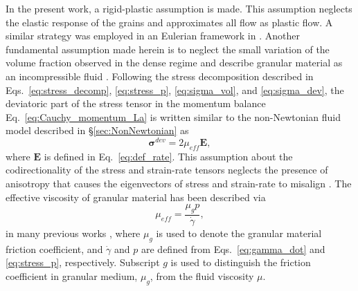 In the present work, a rigid-plastic assumption is made. This assumption neglects the elastic response of the grains and approximates all flow as plastic flow. A similar strategy was employed in an Eulerian framework in \cite{lagree2011granular}. Another fundamental assumption made herein is to neglect the small variation of the volume fraction observed in the dense regime and describe granular material as an incompressible fluid \cite{jop2006constitutiveNature,kamrin2017hierarchy}. Following the stress decomposition described in Eqs.~\ref{eq:stress_decomp}, \ref{eq:stress_p}, \ref{eq:sigma_vol}, and \ref{eq:sigma_dev}, the deviatoric part of the stress tensor in the momentum balance Eq.~\ref{eq:Cauchy_momentum_La} is written similar to the non-Newtonian fluid model described in \S\ref{sec:NonNewtonian} as 
\begin{equation}
\bm{\sigma}^{dev} = 2 \mu_{eff} \bm E, \label{eq:stress_strainrate}
\end{equation}
where $\bm E$ is defined in Eq.~\ref{eq:def_rate}. This assumption about the codirectionality of the stress and strain-rate tensors neglects the presence of anisotropy that causes the eigenvectors of stress and strain-rate to misalign \cite{kamrin2017hierarchy}. The effective viscosity of granular material has been described via 
\begin{equation}
\mu_{eff}=\frac{\mu_g p}{\dot{\gamma} },
\end{equation}
in many previous works \cite{jop2006constitutiveNature}, where $\mu_g$ is used to denote the granular material friction coefficient, and $\dot{\gamma}$ and $p$ are defined from Eqs.~\ref{eq:gamma_dot} and \ref{eq:stress_p}, respectively. Subscript $g$ is used to distinguish the friction coefficient in granular medium, $\mu_g$, from the fluid viscosity $\mu$. 

